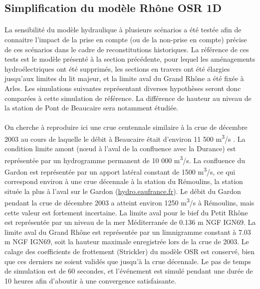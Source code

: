 \documentclass[11pt]{article}
\begin{document}
\FloatBarrier	
	\subsection{Simplification du modèle Rhône OSR 1D}
		
	\paragraph{} La sensibilité du modèle hydraulique à plusieurs scénarios a été testée afin de connaitre l'impact de la prise en compte (ou de la non-prise en compte) précise de ces scénarios dans le cadre de reconstitutions historiques. La référence de ces tests est le modèle présenté à la section précédente, pour lequel les aménagements hydroélectriques ont été supprimés, les sections en travers ont été élargies jusqu'aux limites du lit majeur, et la limite aval du Grand Rhône a été fixée à Arles. Les simulations suivantes représentant diverses hypothèses seront donc comparées à cette simulation de référence. La différence de hauteur au niveau de la station de Pont de Beaucaire sera notamment étudiée.
	
	\paragraph{} On cherche à reproduire ici une crue centennale similaire à la crue de décembre 2003 au cours de laquelle le débit à Beaucaire était d'environ 11 500 m\textsuperscript{3}/s \citep{medd_debit_2005}. La condition limite amont (nœud à l'aval de la confluence avec la Durance) est représentée par un hydrogramme permanent de 10 000 m\textsuperscript{3}/s. La confluence du Gardon est représentée par un apport latéral constant de 1500 m\textsuperscript{3}/s, ce qui correspond environ à une crue décennale à la station du Rémoulins, la station située la plus à l'aval sur le Gardon (\url{hydro.eaufrance.fr}). Le débit du Gardon pendant la crue de décembre 2003 a atteint environ 1250 m\textsuperscript{3}/s à Rémoulins, mais cette valeur est fortement incertaine. La limite aval pour le bief du Petit Rhône est représentée par un niveau de la mer Méditerranée de 0.136 m NGF IGN69. La limite aval du Grand Rhône est représentée par un limnigramme constant à 7.03 m NGF IGN69, soit la hauteur maximale enregistrée lors de la crue de 2003. Le calage des coefficients de frottement (Strickler) du modèle OSR \citep{launay_zabr-osr_2017} est conservé, bien que ces derniers ne soient validés que jusqu'à la crue décennale. Le pas de temps de simulation est de 60 secondes, et l'événement est simulé pendant une durée de 10 heures afin d'aboutir à une convergence satisfaisante.
	
\end{document}
